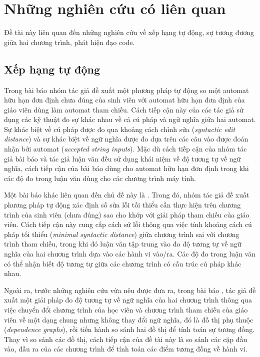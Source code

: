 \section{Những nghiên cứu có liên quan}

Đề tài này liên quan đến những nghiên cứu về xếp hạng tự động, sự
tương đương giữa hai chương trình, phát hiện đạo code.

\subsection*{Xếp hạng tự động}
	
Trong bài báo \cite{alur2013automated} nhóm tác giả đề xuất một phương
pháp tự động so một automat hữu hạn đơn định chưa đúng của sinh viên
với automat hữu hạn đơn định của giáo viên dùng làm automat tham
chiếu. Cách tiếp cận này của các tác giả sử dụng các kỹ thuật đo sự
khác nhau về cả cú pháp và ngữ nghĩa giữa hai automat. Sự khác biệt về
cú pháp được đo qua khoảng cách chỉnh sửa (\emph{syntactic edit
  distance}) và sự khác biệt về ngữ nghĩa được đo dựa trên các
câu vào được đoán nhận bởi automat (\emph{accepted string
  inputs}). Mặc dù cách tiếp cận của nhóm tác giả bài báo và tác giả
luận văn đều sử dụng khái niệm về độ tương tự về ngữ nghĩa, cách tiếp
cận của bài báo dùng cho automat hữu hạn đơn định trong khi các độ đo
trong luận văn dùng cho các chương trình máy tính.

Một bài báo khác liên quan đến chủ đề này là \cite{singh2013automated}. 
Trong đó, nhóm tác giả đề xuất phương pháp tự động
xác định số sửa lỗi tối thiểu cần thực hiện trên chương trình của sinh 
viên (chưa đúng) sao cho khớp với giải pháp tham chiếu của giáo viên. 
Cách tiếp cận này cung cấp cách sử lỗi thông qua việc tính khoảng cách 
cú pháp tối thiểu (\emph{minimal syntactic distance}) giữa chương trình 
sai với chương trình tham chiếu, trong khi đó luận văn tập trung vào đo 
độ tương tự về ngữ nghĩa của hai chương trình dựa vào các hành vi vào/ra. 
Các độ đo trong luận văn có thể nhận biết độ tương tự giữa các chương trình 
có cấu trúc cú pháp khác nhau.

Ngoài ra, trước những nghiên cứu vừa nêu được đưa ra, trong bài báo
\cite{wang2007semantic}, tác giả đề xuất một giải pháp đo độ tương tự
về ngữ nghĩa của hai chương trình thông qua việc chuyển đổi chương
trình của học viên và chương trình tham chiếu của giáo viên về một
dạng chung nhưng không thay đổi ngữ nghĩa, đó là đồ thị phụ thuộc
(\emph{dependence graphs}), rồi tiến hành so sánh hai đồ thị để tính
toán sự tương đồng. Thay vì so sánh các đồ thị, cách tiếp cận của đề
tài này là so sánh các cặp đầu vào, đầu ra của các chương trình để
tính toán các điểm tương đồng về hành vi.
	
